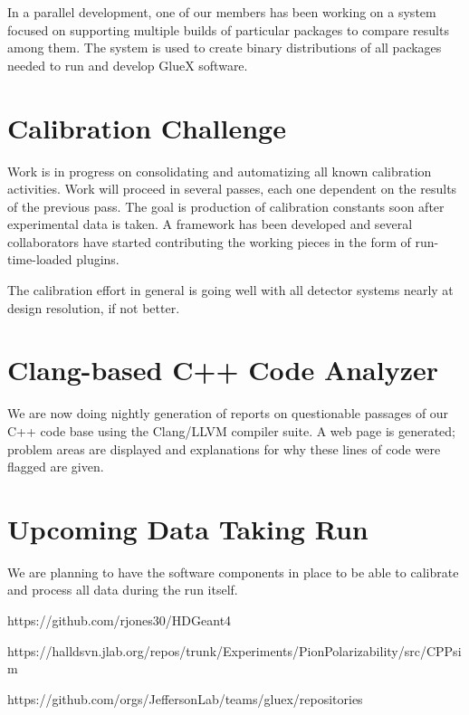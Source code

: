 \documentclass[12pt]{article}
\begin{document}
In a parallel development, one of our members has been working on a
system focused on supporting multiple builds of particular packages to
compare results among them. The system is used to create binary
distributions of all packages needed to run and develop GlueX
software.

\section{Calibration Challenge}

Work is in progress on consolidating and automatizing all known
calibration activities. Work will proceed in several passes, each one
dependent on the results of the previous pass. The goal is production
of calibration constants soon after experimental data is taken. A
framework has been developed and several collaborators have started
contributing the working pieces in the form of run-time-loaded plugins.

The calibration effort in general is going well with all detector
systems nearly at design resolution, if not better.

\section{Clang-based C++ Code Analyzer}

We are now doing nightly generation of reports on questionable passages
of our C++ code base using the Clang/LLVM compiler suite. A web page
is generated; problem areas are displayed and explanations
for why these lines of code were flagged are given.

\section{Upcoming Data Taking Run}

We are planning to have the software components in place to be able to
calibrate and process all data during the run itself.

\begin{thebibliography}{9}

 https://github.com/rjones30/HDGeant4

  https://halldsvn.jlab.org/repos/trunk/Experiments/PionPolarizability/src/CPPsim

  https://github.com/orgs/JeffersonLab/teams/gluex/repositories

\end{thebibliography}
\end{document}
